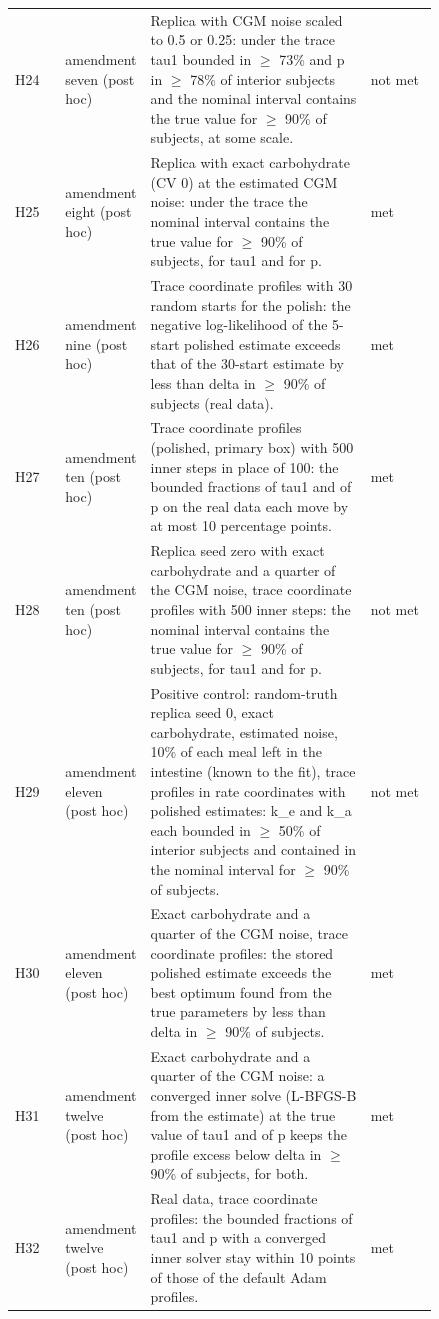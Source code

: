 {\begin{longtable}{lp{0.16\linewidth}p{0.52\linewidth}p{0.16\linewidth}}
H24 & amendment seven (post hoc) & Replica with CGM noise scaled to 0.5 or 0.25: under the trace tau1 bounded in $\ge$ 73\% and p in $\ge$ 78\% of interior subjects and the nominal interval contains the true value for $\ge$ 90\% of subjects, at some scale. & not met \\
H25 & amendment eight (post hoc) & Replica with exact carbohydrate (CV 0) at the estimated CGM noise: under the trace the nominal interval contains the true value for $\ge$ 90\% of subjects, for tau1 and for p. & met \\
H26 & amendment nine (post hoc) & Trace coordinate profiles with 30 random starts for the polish: the negative log-likelihood of the 5-start polished estimate exceeds that of the 30-start estimate by less than delta in $\ge$ 90\% of subjects (real data). & met \\
H27 & amendment ten (post hoc) & Trace coordinate profiles (polished, primary box) with 500 inner steps in place of 100: the bounded fractions of tau1 and of p on the real data each move by at most 10 percentage points. & met \\
H28 & amendment ten (post hoc) & Replica seed zero with exact carbohydrate and a quarter of the CGM noise, trace coordinate profiles with 500 inner steps: the nominal interval contains the true value for $\ge$ 90\% of subjects, for tau1 and for p. & not met \\
H29 & amendment eleven (post hoc) & Positive control: random-truth replica seed 0, exact carbohydrate, estimated noise, 10\% of each meal left in the intestine (known to the fit), trace profiles in rate coordinates with polished estimates: k\_e and k\_a each bounded in $\ge$ 50\% of interior subjects and contained in the nominal interval for $\ge$ 90\% of subjects. & not met \\
H30 & amendment eleven (post hoc) & Exact carbohydrate and a quarter of the CGM noise, trace coordinate profiles: the stored polished estimate exceeds the best optimum found from the true parameters by less than delta in $\ge$ 90\% of subjects. & met \\
H31 & amendment twelve (post hoc) & Exact carbohydrate and a quarter of the CGM noise: a converged inner solve (L-BFGS-B from the estimate) at the true value of tau1 and of p keeps the profile excess below delta in $\ge$ 90\% of subjects, for both. & met \\
H32 & amendment twelve (post hoc) & Real data, trace coordinate profiles: the bounded fractions of tau1 and p with a converged inner solver stay within 10 points of those of the default Adam profiles. & met \\

\end{longtable}}
